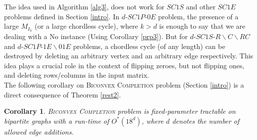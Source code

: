 \documentclass[review, 1p]{elsarticle}
\newtheorem{corollary}{Corollary}
\begin{document}
The idea used in Algorithm \ref{alg3}, does not work for $SC1S$ and other $SC1E$  problems defined in Section \ref{intro}. In $d$-$SC1P$-$0E$ problem, the presence of a large $M_{I_{k}}$ (or a large chordless cycle), where $k>d$ is enough to say that we are dealing with a No instance (Using Corollary \ref{prp3}). But for $d$-$SC1S$-$R \backslash C \backslash RC$ and $d$-$SC1P$-$1E\backslash01E$ problems, a chordless cycle (of any length) can be destroyed by deleting an arbitrary vertex and an arbitrary edge respectively. This idea plays a crucial role in the context of flipping zeroes, but not flipping ones, and deleting rows/columns in the input matrix.\\
\indent The following corollary on \textsc{Biconvex Completion} problem (Section \ref{intro}) is a direct consequence of Theorem \ref{rest2}.
\begin{corollary}
\textsc{Biconvex Completion} problem is fixed-parameter tractable on bipartite graphs with a run-time of $O^{*}(18^{d})$, where $d$ denotes the number of allowed edge additions.
\end{corollary}
\end{document}
